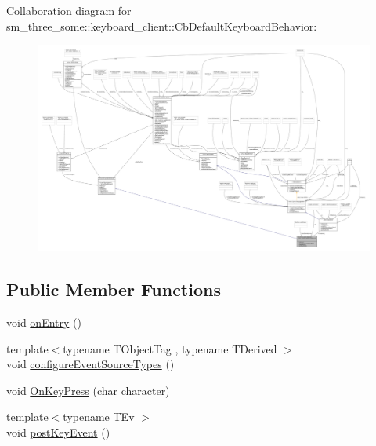 Collaboration diagram for sm\+\_\+three\+\_\+some\+:\+:keyboard\+\_\+client\+:\+:Cb\+Default\+Keyboard\+Behavior\+:
\nopagebreak
\begin{figure}[H]
\begin{center}
\leavevmode
\includegraphics[width=350pt]{classsm__three__some_1_1keyboard__client_1_1CbDefaultKeyboardBehavior__coll__graph}
\end{center}
\end{figure}
\subsection*{Public Member Functions}
\begin{DoxyCompactItemize}
\item 
void \hyperlink{classsm__three__some_1_1keyboard__client_1_1CbDefaultKeyboardBehavior_a78d37ef2ecfecea9fd9f08165b74f0e6}{on\+Entry} ()
\item 
{\footnotesize template$<$typename T\+Object\+Tag , typename T\+Derived $>$ }\\void \hyperlink{classsm__three__some_1_1keyboard__client_1_1CbDefaultKeyboardBehavior_aba7425af1516e605ceb83f60643afc43}{configure\+Event\+Source\+Types} ()
\item 
void \hyperlink{classsm__three__some_1_1keyboard__client_1_1CbDefaultKeyboardBehavior_ac02d0d6c7689678c8159791fcb1a8f8e}{On\+Key\+Press} (char character)
\item 
{\footnotesize template$<$typename T\+Ev $>$ }\\void \hyperlink{classsm__three__some_1_1keyboard__client_1_1CbDefaultKeyboardBehavior_a290a36cc9e87a98d9633fcc9ed35e059}{post\+Key\+Event} ()
\end{DoxyCompactItemize}
